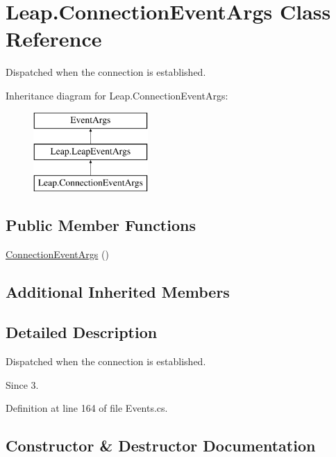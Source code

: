 \hypertarget{class_leap_1_1_connection_event_args}{}\section{Leap.\+Connection\+Event\+Args Class Reference}
\label{class_leap_1_1_connection_event_args}


Dispatched when the connection is established.  


Inheritance diagram for Leap.\+Connection\+Event\+Args\+:\begin{figure}[H]
\begin{center}
\leavevmode
\includegraphics[height=3.000000cm]{class_leap_1_1_connection_event_args}
\end{center}
\end{figure}
\subsection*{Public Member Functions}
\begin{DoxyCompactItemize}
\item 
\mbox{\hyperlink{class_leap_1_1_connection_event_args_aec869b274560e9acb534f951aa2030eb}{Connection\+Event\+Args}} ()
\end{DoxyCompactItemize}
\subsection*{Additional Inherited Members}


\subsection{Detailed Description}
Dispatched when the connection is established. 

\begin{DoxySince}{Since}
3. 
\end{DoxySince}


Definition at line 164 of file Events.\+cs.



\subsection{Constructor \& Destructor Documentation}
\mbox{\label{class_leap_1_1_connection_event_args_aec869b274560e9acb534f951aa2030eb}} 

